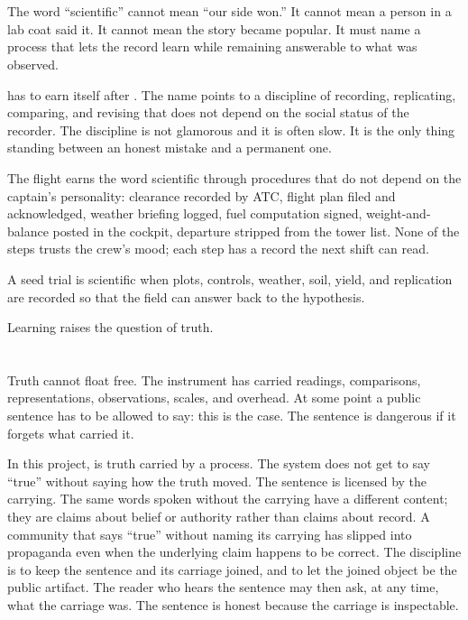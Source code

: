 \section{}
\label{se:scientific}

The word ``scientific'' cannot mean ``our side won.'' It cannot mean a
person in a lab coat said it. It cannot mean the story became popular.
It must name a process that lets the record learn while remaining
answerable to what was observed.

 has to earn itself after . The name
points to a discipline of recording, replicating, comparing, and
revising that does not depend on the social status of the recorder.
The discipline is not glamorous and it is often slow. It is the only
thing standing between an honest mistake and a permanent one.

The flight earns the word scientific through procedures that do not
depend on the captain's personality: clearance recorded by ATC, flight
plan filed and acknowledged, weather briefing logged, fuel computation
signed, weight-and-balance posted in the cockpit, departure stripped
from the tower list. None of the steps trusts the crew's mood; each
step has a record the next shift can read.

A seed trial is scientific when plots, controls, weather, soil, yield,
and replication are recorded so that the field can answer back to the
hypothesis.

Learning raises the question of truth.

\section{}
\label{se:truth}

Truth cannot float free. The instrument has carried readings,
comparisons, representations, observations, scales, and overhead. At
some point a public sentence has to be allowed to say: this is the
case. The sentence is dangerous if it forgets what carried it.

In this project,  is truth carried by a process. The
system does not get to say ``true'' without saying how the truth
moved. The sentence is licensed by the carrying. The same words spoken
without the carrying have a different content; they are claims about
belief or authority rather than claims about record. A community that
says ``true'' without naming its carrying has slipped into propaganda
even when the underlying claim happens to be correct. The discipline
is to keep the sentence and its carriage joined, and to let the
joined object be the public artifact. The reader who hears the
sentence may then ask, at any time, what the carriage was. The
sentence is honest because the carriage is inspectable.

